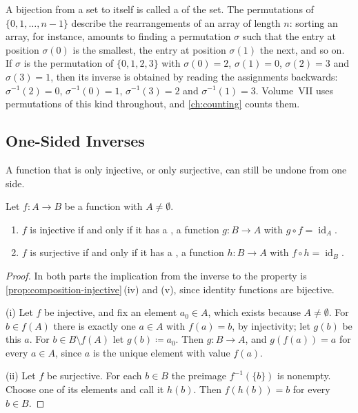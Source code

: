 A bijection from a set to itself is called a  of the set. The permutations of $\{0,1,\ldots,n-1\}$ describe the rearrangements of an array of length $n$: sorting an array, for instance, amounts to finding a permutation $\sigma$ such that the entry at position $\sigma(0)$ is the smallest, the entry at position $\sigma(1)$ the next, and so on. If $\sigma$ is the permutation of $\{0,1,2,3\}$ with $\sigma(0)=2$, $\sigma(1)=0$, $\sigma(2)=3$ and $\sigma(3)=1$, then its inverse is obtained by reading the assignments backwards: $\sigma^{-1}(2)=0$, $\sigma^{-1}(0)=1$, $\sigma^{-1}(3)=2$ and $\sigma^{-1}(1)=3$. Volume~VII uses permutations of this kind throughout, and \cref{ch:counting} counts them.

\subsection{One-Sided Inverses}

A function that is only injective, or only surjective, can still be undone from one side.

\begin{proposition}
\label{prop:one-sided}
Let $f\colon A\to B$ be a function with $A\ne\emptyset$.
\begin{enumerate}
\item $f$ is injective if and only if it has a , a function $g\colon B\to A$ with $g\circ f=\operatorname{id}_A$.
\item $f$ is surjective if and only if it has a , a function $h\colon B\to A$ with $f\circ h=\operatorname{id}_B$.
\end{enumerate}
\end{proposition}

\begin{proof}
In both parts the implication from the inverse to the property is \cref{prop:composition-injective}\,(iv) and (v), since identity functions are bijective.

(i) Let $f$ be injective, and fix an element $a_0\in A$, which exists because $A\ne\emptyset$. For $b\in f(A)$ there is exactly one $a\in A$ with $f(a)=b$, by injectivity; let $g(b)$ be this $a$. For $b\in B\setminus f(A)$ let $g(b)\coloneqq a_0$. Then $g\colon B\to A$, and $g(f(a))=a$ for every $a\in A$, since $a$ is the unique element with value $f(a)$.

(ii) Let $f$ be surjective. For each $b\in B$ the preimage $f^{-1}(\{b\})$ is nonempty. Choose one of its elements and call it $h(b)$. Then $f(h(b))=b$ for every $b\in B$.
\end{proof}

